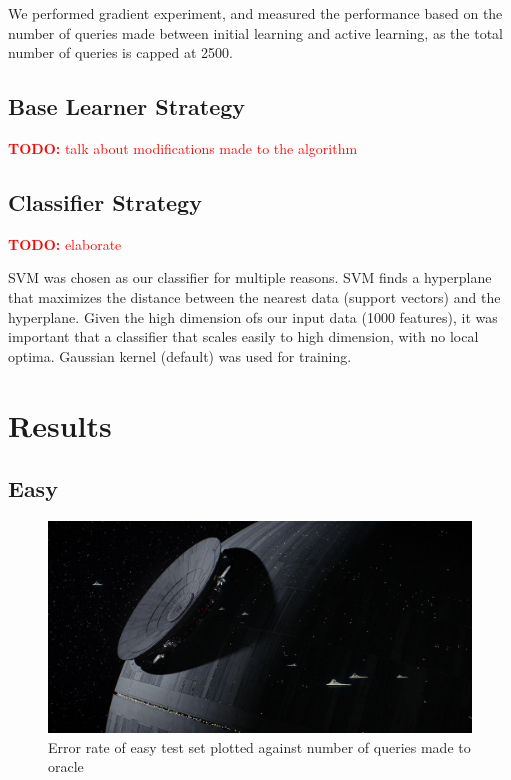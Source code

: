 \documentclass[paper=a4, fontsize=11pt]{scrartcl}
\numberwithin{equation}{section}    %
\numberwithin{figure}{section}      %
\numberwithin{table}{section}       %
\newcommand{\TODO}[1]{\textcolor{red}{\textbf{TODO: } #1}}
\numberwithin{equation}{section}    %
\numberwithin{figure}{section}      %
\numberwithin{table}{section}       %
\begin{document}
We performed gradient experiment, and measured the performance based on the number of queries made between initial learning and active learning, as the total number of queries is capped at 2500. 


\subsection{Base Learner Strategy}





\TODO{talk about modifications made to the algorithm}

\subsection{Classifier Strategy}

\TODO{elaborate}


SVM was chosen as our classifier for multiple reasons. SVM finds a hyperplane that maximizes the distance between the nearest data (support vectors) and the hyperplane. Given the high dimension ofs our input data (1000 features), it was important that a classifier that scales easily to high dimension, with no local optima. 
Gaussian kernel (default) was used for training. 


\section{Results}

\subsection{Easy}


\begin{figure}[!htb]
  \centering
  \includegraphics[scale = 0.35]{figures/fig.jpg}
      \caption{Error rate of easy test set plotted against number of queries made to oracle}
      \label{easyerror}
\end{figure}
\end{document}
